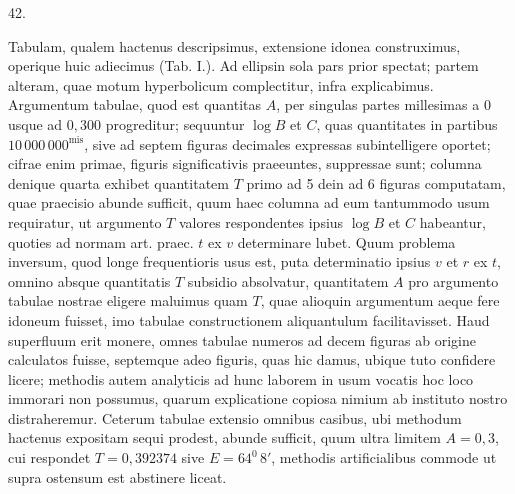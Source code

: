\begin{center}
42.
\end{center}
Tabulam, qualem hactenus descripsimus, extensione idonea construximus, operique huic adiecimus (Tab. I.). Ad ellipsin sola pars prior spectat; partem alteram, quae motum hyperbolicum complectitur, infra explicabimus. Argumentum tabulae, quod est quantitas $A$, per singulas partes millesimas a $0$ usque ad $0{,}300$ progreditur; sequuntur $\log B$ et $C$, quas quantitates in partibus $10\,000\,000^{\mathrm{mis}}$, sive ad septem figuras decimales expressas subintelligere oportet; cifrae enim primae, figuris significativis praeeuntes, suppressae sunt; columna denique quarta exhibet quantitatem $T$ primo ad 5 dein ad 6 figuras computatam, quae praecisio abunde sufficit, quum haec columna ad eum tantummodo usum requiratur, ut argumento $T$ valores respondentes ipsius $\log B$ et $C$ habeantur, quoties ad normam art. praec. $t$ ex $v$ determinare lubet. Quum problema inversum, quod longe frequentioris usus est, puta determinatio ipsius $v$ et $r$ ex $t$, omnino absque quantitatis $T$ subsidio absolvatur, quantitatem $A$ pro argumento tabulae nostrae eligere maluimus quam $T$, quae alioquin argumentum aeque fere idoneum fuisset, imo tabulae constructionem aliquantulum facilitavisset. Haud superfluum erit monere, omnes tabulae numeros ad decem figuras ab origine calculatos fuisse, septemque adeo figuris, quas hic damus, ubique tuto confidere licere; methodis autem analyticis ad hunc laborem in usum vocatis hoc loco immorari non possumus, quarum explicatione copiosa nimium ab instituto nostro distraheremur. Ceterum tabulae extensio omnibus casibus, ubi methodum hactenus expositam sequi prodest, abunde sufficit, quum ultra limitem $A=0{,}3$, cui respondet $T=0{,}392374$ sive $E=64^0\,8'$, methodis artificialibus commode ut supra ostensum est abstinere liceat.
